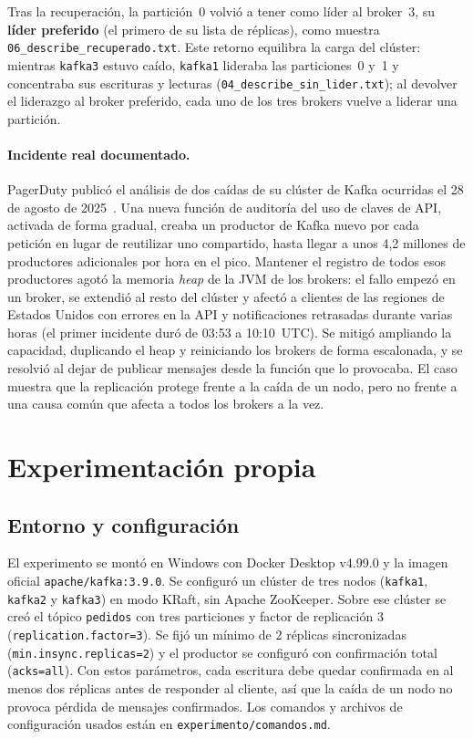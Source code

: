 \documentclass[12pt,a4paper]{article}
\begin{document}
Tras la recuperación, la partición~0 volvió a tener como líder al broker~3, su \textbf{líder preferido} (el primero de su lista de réplicas), como muestra \texttt{06\_describe\_recuperado.txt}. Este retorno equilibra la carga del clúster: mientras \texttt{kafka3} estuvo caído, \texttt{kafka1} lideraba las particiones~0 y~1 y concentraba sus escrituras y lecturas (\texttt{04\_describe\_sin\_lider.txt}); al devolver el liderazgo al broker preferido, cada uno de los tres brokers vuelve a liderar una partición.

\paragraph{Incidente real documentado.} PagerDuty publicó el análisis de dos caídas de su clúster de Kafka ocurridas el 28 de agosto de 2025~\cite{PagerDuty2025}. Una nueva función de auditoría del uso de claves de API, activada de forma gradual, creaba un productor de Kafka nuevo por cada petición en lugar de reutilizar uno compartido, hasta llegar a unos 4,2 millones de productores adicionales por hora en el pico. Mantener el registro de todos esos productores agotó la memoria \textit{heap} de la JVM de los brokers: el fallo empezó en un broker, se extendió al resto del clúster y afectó a clientes de las regiones de Estados Unidos con errores en la API y notificaciones retrasadas durante varias horas (el primer incidente duró de 03:53 a 10:10~UTC). Se mitigó ampliando la capacidad, duplicando el heap y reiniciando los brokers de forma escalonada, y se resolvió al dejar de publicar mensajes desde la función que lo provocaba. El caso muestra que la replicación protege frente a la caída de un nodo, pero no frente a una causa común que afecta a todos los brokers a la vez.

\section{Experimentación propia}\label{sec:experimentacion}

\subsection{Entorno y configuración}
El experimento se montó en Windows con Docker Desktop v4.99.0 y la imagen oficial \texttt{apache/kafka:3.9.0}. Se configuró un clúster de tres nodos (\texttt{kafka1}, \texttt{kafka2} y \texttt{kafka3}) en modo KRaft, sin Apache ZooKeeper. Sobre ese clúster se creó el tópico \texttt{pedidos} con tres particiones y factor de replicación 3 (\texttt{replication.factor=3}). Se fijó un mínimo de 2 réplicas sincronizadas (\texttt{min.insync.replicas=2}) y el productor se configuró con confirmación total (\texttt{acks=all}). Con estos parámetros, cada escritura debe quedar confirmada en al menos dos réplicas antes de responder al cliente, así que la caída de un nodo no provoca pérdida de mensajes confirmados. Los comandos y archivos de configuración usados están en \texttt{experimento/comandos.md}.
\end{document}
